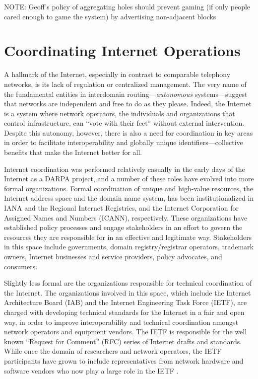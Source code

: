 NOTE: Geoff's policy of aggregating holes should prevent gaming (if only people
cared enough to game the system) by advertising non-adjacent blocks

\section{Coordinating Internet Operations}

A hallmark of the Internet, especially in contrast to comparable telephony
networks, is its lack of regulation or centralized management. The very name of
the fundamental entities in interdomain routing---\emph{autonomous}
systems---suggest that networks are independent and free to do as they please.
Indeed, the Internet is a system where network operators, the individuals and
organizations that control infrastructure, can ``vote with their feet'' without
external intervention. Despite this autonomy, however, there is also a need for
coordination in key areas in order to facilitate interoperability and globally
unique identifiers---collective benefits that make the Internet better for
all.

Internet coordination was performed relatively casually in the early days of
the Internet as a DARPA project, and a number of these roles have evolved into
more formal organizations. Formal coordination of unique and high-value
resources, the Internet address space and the domain name system, has been
institutionalized in IANA and the Regional Internet Registries, and the
Internet Corporation for Assigned Names and Numbers (ICANN), respectively.
These organizations have established policy processes and engage stakeholders
in an effort to govern the resources they are responsible for in an effective
and legitimate way. Stakeholders in this space include governments,
domain registry/registrar operators, trademark owners, Internet businesses and
service providers, policy advocates, and consumers.

Slightly less formal are the organizations responsible for technical
coordination of the Internet. The organizations involved in this space, which
include the Internet Architecture Board (IAB) and the Internet Engineering Task
Force (IETF), are charged with developing technical standards for the Internet
in a fair and open way, in order to improve interoperability and technical
coordination amongst network operators and equipment vendors. The IETF is
responsible for the well known ``Request for Comment'' (RFC) series of Internet
drafts and standards. While once the domain of researchers and network
operators, the IETF participants have grown to include representatives from
network hardware and software vendors who now play a large role in the IETF
\cite{Li:2011vn}.

